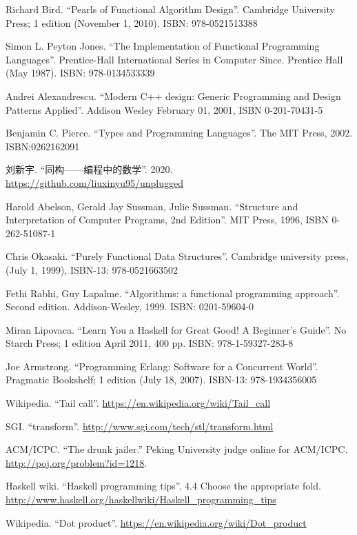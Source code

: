 \documentclass[b5paper]{ctexart}
\begin{document}
\begin{thebibliography}{99}

Richard Bird. ``Pearls of Functional Algorithm Design''. Cambridge University Press; 1 edition (November 1, 2010). ISBN: 978-0521513388

Simon L. Peyton Jones. ``The Implementation of Functional Programming Languages''. Prentice-Hall International Series in Computer Since. Prentice Hall (May 1987). ISBN: 978-0134533339

Andrei Alexandrescu. ``Modern C++ design: Generic Programming and Design Patterns Applied''. Addison Wesley February 01, 2001, ISBN 0-201-70431-5

Benjamin C. Pierce. ``Types and Programming Languages''. The MIT Press, 2002. ISBN:0262162091

刘新宇. ``同构——编程中的数学''. 2020. \url{https://github.com/liuxinyu95/unplugged}

Harold Abelson, Gerald Jay Sussman, Julie Sussman. ``Structure and Interpretation of Computer Programs, 2nd Edition''. MIT Press, 1996, ISBN 0-262-51087-1

Chris Okasaki. ``Purely Functional Data Structures''. Cambridge university press, (July 1, 1999), ISBN-13: 978-0521663502

Fethi Rabhi, Guy Lapalme. ``Algorithms: a functional programming approach''. Second edition. Addison-Wesley, 1999. ISBN: 0201-59604-0

Miran Lipovaca. ``Learn You a Haskell for Great Good! A Beginner's Guide''. No Starch Press; 1 edition April 2011, 400 pp. ISBN: 978-1-59327-283-8

Joe Armstrong. ``Programming Erlang: Software for a Concurrent World''. Pragmatic Bookshelf; 1 edition (July 18, 2007). ISBN-13: 978-1934356005

Wikipedia. ``Tail call''. \url{https://en.wikipedia.org/wiki/Tail_call}

SGI. ``transform''. \url{http://www.sgi.com/tech/stl/transform.html}

ACM/ICPC. ``The drunk jailer.'' Peking University judge online for ACM/ICPC. \url{http://poj.org/problem?id=1218}.

Haskell wiki. ``Haskell programming tips''. 4.4 Choose the appropriate fold. \url{http://www.haskell.org/haskellwiki/Haskell_programming_tips}

Wikipedia. ``Dot product''. \url{https://en.wikipedia.org/wiki/Dot_product}

\end{thebibliography}

\expandafter\enddocument
\fi
\end{document}

